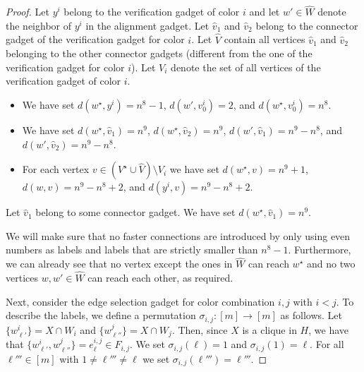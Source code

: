 \documentclass[a4paper,UKenglish,cleveref, autoref, thm-restate]{lipics-v2021}
\begin{document}
\begin{proof}
Let $y^i$ belong to the verification gadget of color $i$ and let $w'\in \hat{W}$ denote the neighbor of $y^i$ in the alignment gadget. Let $\hat{v}_1$ and $\hat{v}_2$ belong to the connector gadget of the verification gadget for color $i$. Let $\hat{V}$ contain all vertices $\hat{v}_1$ and $\hat{v}_2$ belonging to the other connector gadgets (different from the one of the verification gadget for color $i$). Let $V_i$ denote the set of all vertices of the verification gadget of color $i$.
\begin{itemize}
    \item We have set $d(w^\star,y^i)=n^8-1$, $d(w',v^i_0)=2$, and $d(w^\star,v^i_0)=n^8$.
    \item We have set $d(w^\star,\hat{v}_1)=n^9$, $d(w^\star,\hat{v}_2)=n^9$, $d(w',\hat{v}_1)=n^9-n^8$, and $d(w',\hat{v}_2)=n^9-n^8$.
    \item For each vertex $v\in (V^\star\cup \hat{V})\setminus V_i$ we have set $d(w^\star,v)=n^9+1$, $d(w,v)=n^9-n^8+2$, and $d(y^i,v)=n^9-n^8+2$.
\end{itemize}
Let $\hat{v}_1$ belong to some connector gadget. We have set $d(w^\star,\hat{v}_1)=n^9$.

We will make sure that no faster connections are introduced by only using even numbers as labels and labels that are strictly smaller than $n^8-1$. Furthermore, we can already see that no vertex except the ones in $\hat{W}$ can reach $w^\star$ and no two vertices $w,w'\in\hat{W}$ can reach each other, as required.














Next, consider the edge selection gadget for color combination $i,j$ with $i<j$.
To describe the labels, we define a permutation $\sigma_{i,j}:[m]\rightarrow [m]$ as follows. Let $\{w^i_{\ell'}\}=X\cap W_i$ and $\{w^j_{\ell''}\}=X\cap W_j$. Then, since $X$ is a clique in $H$, we have that $\{w^i_{\ell'},w^j_{\ell''}\}=e^{i,j}_\ell\in F_{i,j}$. We set $\sigma_{i,j}(\ell)=1$ and $\sigma_{i,j}(1)=\ell$. For all $\ell'''\in[m]$ with $1\neq\ell'''\neq\ell$ we set $\sigma_{i,j}(\ell''')=\ell'''$.


\end{proof}
\end{document}
